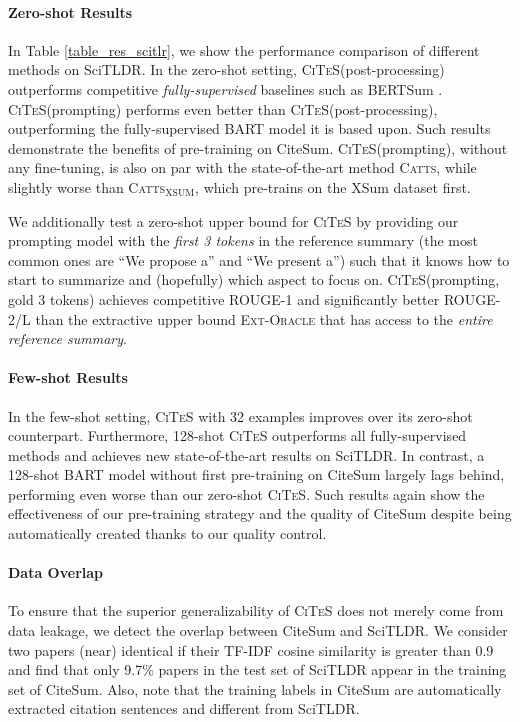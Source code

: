 \documentclass[11pt]{article}
\newcommand{\Catts}{\textsc{Catts}\xspace}
\newcommand{\Cattsxsum}{\textsc{Catts}$_\mathrm{XSUM}$\xspace}
\newcommand{\ours}{\textsc{CiTeS}\xspace}
\newcommand{\ourdata}{CiteSum\xspace}
\begin{document}
\paragraph{Zero-shot Results}

In Table \ref{table_res_scitlr}, we show the performance comparison of different methods on SciTLDR.
In the zero-shot setting, \ours (post-processing) outperforms competitive\textit{ fully-supervised} baselines such as BERTSum \cite{liu-lapata-2019-text}.
\ours (prompting) performs even better than \ours (post-processing), outperforming the fully-supervised BART model it is based upon.
Such results demonstrate the benefits of pre-training on \ourdata.
\ours (prompting), without any fine-tuning, is also on par with the state-of-the-art method \Catts \cite{cachola-etal-2020-tldr}, while slightly worse than \Cattsxsum, which pre-trains on the XSum dataset \cite{narayan-etal-2018-dont} first.

We additionally test a zero-shot upper bound for \ours by providing our prompting model with the \textit{first 3 tokens} in the reference summary (the most common ones are ``We propose a'' and ``We present a'') such that it knows how to start to summarize and (hopefully) which aspect to focus on.
\ours (prompting, gold 3 tokens) achieves competitive ROUGE-1 and significantly better ROUGE-2/L than the extractive upper bound \textsc{Ext-Oracle} that has access to the \textit{entire reference summary}.

\paragraph{Few-shot Results}
In the few-shot setting, \ours with 32 examples improves over its zero-shot counterpart.
Furthermore, 128-shot \ours outperforms all fully-supervised methods and achieves new state-of-the-art results on SciTLDR.
In contrast, a 128-shot BART model without first pre-training on \ourdata largely lags behind, performing even worse than our zero-shot \ours.
Such results again show the effectiveness of our pre-training strategy and the quality of \ourdata despite being automatically created thanks to our quality control.

\paragraph{Data Overlap}
To ensure that the superior generalizability of \ours does not merely come from data leakage, we detect the overlap between \ourdata and SciTLDR.
We consider two papers (near) identical if their TF-IDF cosine similarity is greater than 0.9 and find that only 9.7\% papers in the test set of SciTLDR appear in the training set of \ourdata. Also, note that the training labels in \ourdata are automatically extracted citation sentences and different from SciTLDR.
\end{document}
